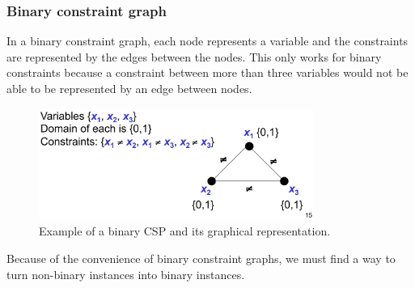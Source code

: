 \documentclass[CS4402-Notes.tex]{subfiles}
\begin{document}
\subsubsection{Binary constraint graph}
In a binary constraint graph, each node represents a variable and the constraints are represented by the edges between the nodes. This only works for binary constraints because a constraint between more than three variables would not be able to be represented by an edge between nodes.
\begin{figure}[H]
  \centering
  \includegraphics[width=0.8\textwidth, keepaspectratio]{imgs/binary-constraint-graph.png}
  \caption{Example of a binary CSP and its graphical representation.}
\end{figure}
\noindent
Because of the convenience of binary constraint graphs, we must find a way to turn non-binary instances into binary instances.
\end{document}
